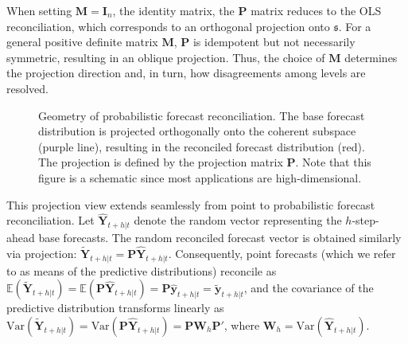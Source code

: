 \documentclass[
  11pt,
  letterpaper,
  DIV=11,
  numbers=noendperiod,
  titlepage]{scrartcl}
\begin{document}
When setting \(\boldsymbol{M} = \boldsymbol{I}_n\), the identity matrix,
the \(\boldsymbol{P}\) matrix reduces to the OLS reconciliation, which
corresponds to an orthogonal projection onto \(\mathfrak{s}\). For a
general positive definite matrix \(\boldsymbol{M}\), \(\boldsymbol{P}\)
is idempotent but not necessarily symmetric, resulting in an oblique
projection. Thus, the choice of \(\boldsymbol{M}\) determines the
projection direction and, in turn, how disagreements among levels are
resolved.

\begin{figure}


\caption{\label{fig-geometry}Geometry of probabilistic forecast
reconciliation. The base forecast distribution is projected orthogonally
onto the coherent subspace (purple line), resulting in the reconciled
forecast distribution (red). The projection is defined by the projection
matrix \(\boldsymbol{P}\). Note that this figure is a schematic since
most applications are high-dimensional.}

\end{figure}%

This projection view extends seamlessly from point to probabilistic
forecast reconciliation. Let \(\hat{\boldsymbol{Y}}_{t+h|t}\) denote the
random vector representing the \(h\)-step-ahead base forecasts. The
random reconciled forecast vector is obtained similarly via projection:
\(\tilde{\boldsymbol{Y}}_{t+h|t} = \boldsymbol{P} \hat{\boldsymbol{Y}}_{t+h|t}\).
Consequently, point forecasts (which we refer to as means of the
predictive distributions) reconcile as
\(\mathbb{E}(\tilde{\boldsymbol{Y}}_{t+h|t}) = \mathbb{E}(\boldsymbol{P} \hat{\boldsymbol{Y}}_{t+h|t}) = \boldsymbol{P} \hat{\boldsymbol{y}}_{t+h|t} = \tilde{\boldsymbol{y}}_{t+h|t}\),
and the covariance of the predictive distribution transforms linearly as
\(\text{Var}(\tilde{\boldsymbol{Y}}_{t+h|t}) = \text{Var}(\boldsymbol{P} \hat{\boldsymbol{Y}}_{t+h|t}) = \boldsymbol{P} \boldsymbol{W}_h \boldsymbol{P}'\),
where \(\boldsymbol{W}_h = \text{Var}(\hat{\boldsymbol{Y}}_{t+h|t})\).
\end{document}

